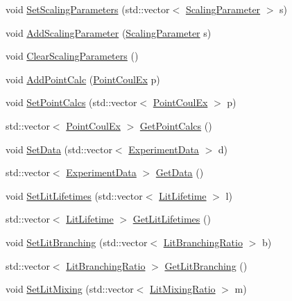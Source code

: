 \begin{DoxyCompactItemize}
void \hyperlink{classCoulExFitter_a900b2c3070ea11e65c6ce6753d50f644}{Set\-Scaling\-Parameters} (std\-::vector$<$ \hyperlink{classScalingParameter}{Scaling\-Parameter} $>$ s)
\item 
void \hyperlink{classCoulExFitter_ab0bb6b9cb3f63281e4e310a359293e24}{Add\-Scaling\-Parameter} (\hyperlink{classScalingParameter}{Scaling\-Parameter} s)
\item 
void \hyperlink{classCoulExFitter_a379e336a5bf3534a68a2b30aae1b03d6}{Clear\-Scaling\-Parameters} ()
\item 
void \hyperlink{classCoulExFitter_aa61a8d54329e77a5a8ffc7d760a7acad}{Add\-Point\-Calc} (\hyperlink{classPointCoulEx}{Point\-Coul\-Ex} p)
\item 
void \hyperlink{classCoulExFitter_ad3dadcfe5be98bd37a9a0e10ba8866ef}{Set\-Point\-Calcs} (std\-::vector$<$ \hyperlink{classPointCoulEx}{Point\-Coul\-Ex} $>$ p)
\item 
std\-::vector$<$ \hyperlink{classPointCoulEx}{Point\-Coul\-Ex} $>$ \hyperlink{classCoulExFitter_af845588f78e360df8f1054b2b06b1320}{Get\-Point\-Calcs} ()
\item 
void \hyperlink{classCoulExFitter_a44ec14a6b681ac7feccdf2dc119a5450}{Set\-Data} (std\-::vector$<$ \hyperlink{classExperimentData}{Experiment\-Data} $>$ d)
\item 
std\-::vector$<$ \hyperlink{classExperimentData}{Experiment\-Data} $>$ \hyperlink{classCoulExFitter_a8bbef087dbeab8832c0cfb52b6b7f8de}{Get\-Data} ()
\item 
void \hyperlink{classCoulExFitter_a4404962fd56e3d1543061b5d141d655f}{Set\-Lit\-Lifetimes} (std\-::vector$<$ \hyperlink{classLitLifetime}{Lit\-Lifetime} $>$ l)
\item 
std\-::vector$<$ \hyperlink{classLitLifetime}{Lit\-Lifetime} $>$ \hyperlink{classCoulExFitter_a16cb5175295b5f14547db8dd63f95541}{Get\-Lit\-Lifetimes} ()
\item 
void \hyperlink{classCoulExFitter_a349703eec8df817afb031d536622af69}{Set\-Lit\-Branching} (std\-::vector$<$ \hyperlink{classLitBranchingRatio}{Lit\-Branching\-Ratio} $>$ b)
\item 
std\-::vector$<$ \hyperlink{classLitBranchingRatio}{Lit\-Branching\-Ratio} $>$ \hyperlink{classCoulExFitter_a74d75b806bee4687703d1611c7710ad8}{Get\-Lit\-Branching} ()
\item 
void \hyperlink{classCoulExFitter_a67e04682849c9234aa200006aa614f1a}{Set\-Lit\-Mixing} (std\-::vector$<$ \hyperlink{classLitMixingRatio}{Lit\-Mixing\-Ratio} $>$ m)
\item 

\end{DoxyCompactItemize}
